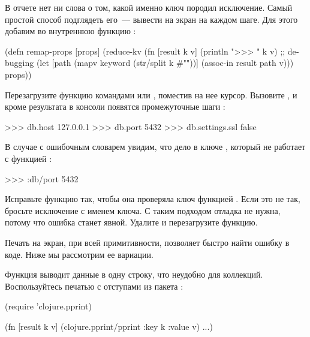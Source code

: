 В отчете нет ни слова о том, какой именно ключ породил исключение. Самый простой способ подглядеть его~--- вывести на экран на каждом шаге. Для этого добавим  во внутреннюю функцию :

\begin{english}
  \begin{clojure}
(defn remap-props [props]
  (reduce-kv
   (fn [result k v]
     (println ">>> " k v) ;; debugging
     (let [path
           (mapv keyword (str/split k #"\."))]
       (assoc-in result path v)))
   {}
   props))
  \end{clojure}
\end{english}

Перезагрузите функцию командами  или , поместив на нее курсор. Вызовите , и кроме результата в консоли появятся промежуточные шаги :

\begin{english}
  \begin{text}
>>>  db.host 127.0.0.1
>>>  db.port 5432
>>>  db.settings.ssl false
  \end{text}
\end{english}

В случае с ошибочным словарем увидим, что дело в ключе , который не работает с функцией :

\begin{english}
  \begin{text}
>>>  :db/port 5432
  \end{text}
\end{english}

Исправьте функцию так, чтобы она проверяла ключ функцией . Если это не так, бросьте исключение с именем ключа. С таким подходом отладка не нужна, потому что ошибка станет явной. Удалите  и перезагрузите функцию.

Печать на экран, при всей примитивности, позволяет быстро найти ошибку в коде. Ниже мы рассмотрим ее вариации.

Функция  выводит данные в одну строку, что неудобно для коллекций. Воспользуйтесь печатью с отступами из пакета :

\begin{english}
  \begin{clojure}
(require 'clojure.pprint)

(fn [result k v]
  (clojure.pprint/pprint {:key k :value v})
  ...)
  \end{clojure}
\end{english}

